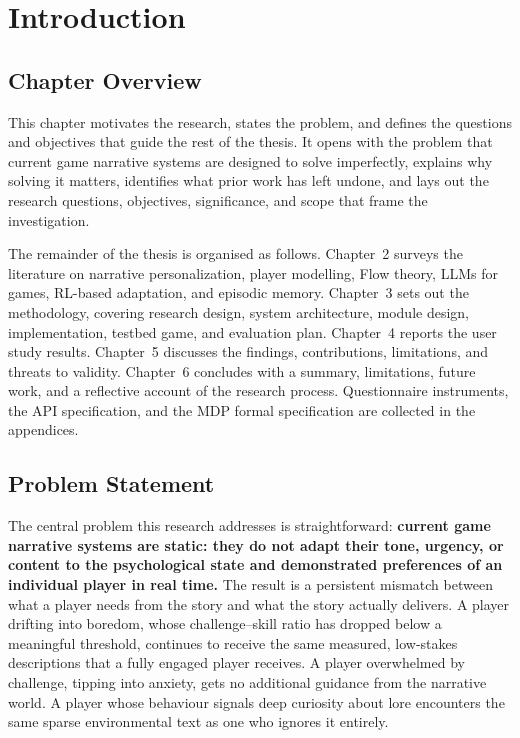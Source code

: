 \chapter{Introduction}

\section{Chapter Overview}

This chapter motivates the research, states the problem, and defines the questions and objectives that guide the rest of the thesis. It opens with the problem that current game narrative systems are designed to solve imperfectly, explains why solving it matters, identifies what prior work has left undone, and lays out the research questions, objectives, significance, and scope that frame the investigation.

The remainder of the thesis is organised as follows. Chapter~2 surveys the literature on narrative personalization, player modelling, Flow theory, LLMs for games, RL-based adaptation, and episodic memory. Chapter~3 sets out the methodology, covering research design, system architecture, module design, implementation, testbed game, and evaluation plan. Chapter~4 reports the user study results. Chapter~5 discusses the findings, contributions, limitations, and threats to validity. Chapter~6 concludes with a summary, limitations, future work, and a reflective account of the research process. Questionnaire instruments, the API specification, and the MDP formal specification are collected in the appendices.

\section{Problem Statement}

The central problem this research addresses is straightforward: \textbf{current game narrative systems are static: they do not adapt their tone, urgency, or content to the psychological state and demonstrated preferences of an individual player in real time.} The result is a persistent mismatch between what a player needs from the story and what the story actually delivers. A player drifting into boredom, whose challenge--skill ratio has dropped below a meaningful threshold, continues to receive the same measured, low-stakes descriptions that a fully engaged player receives. A player overwhelmed by challenge, tipping into anxiety, gets no additional guidance from the narrative world. A player whose behaviour signals deep curiosity about lore encounters the same sparse environmental text as one who ignores it entirely.

